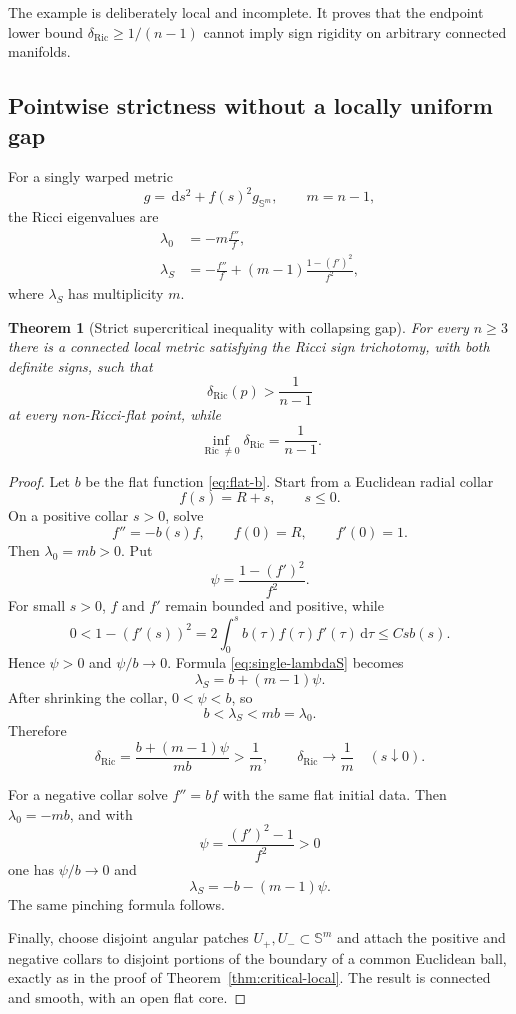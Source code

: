 \documentclass[11pt,reqno]{amsart}
\newtheorem{theorem}{Theorem}[section]
\theoremstyle{definition}
\theoremstyle{remark}
\newcommand{\Ric}{\operatorname{Ric}}
\newcommand{\dd}{\,\mathrm d}
\newcommand{\Sph}{\mathbb S}
\newcommand{\dric}{\delta_{\mathrm{Ric}}}
\begin{document}
The example is deliberately local and incomplete.  It proves that the endpoint lower bound $\dric\ge1/(n-1)$ cannot imply sign rigidity on arbitrary connected manifolds.

\subsection{Pointwise strictness without a locally uniform gap}

For a singly warped metric
\begin{equation}\label{eq:singly-sphere}
g=\dd s^2+f(s)^2g_{\Sph^m},
\qquad m=n-1,
\end{equation}
the Ricci eigenvalues are
\begin{align}
\lambda_0&=-m\frac{f''}{f},\label{eq:single-lambda0}\\
\lambda_S&=-\frac{f''}{f}+(m-1)\frac{1-(f')^2}{f^2},\label{eq:single-lambdaS}
\end{align}
where $\lambda_S$ has multiplicity $m$.

\begin{theorem}[Strict supercritical inequality with collapsing gap]\label{thm:strict-no-gap}
For every $n\ge3$ there is a connected local metric satisfying the Ricci sign trichotomy, with both definite signs, such that
\[
\dric(p)>\frac1{n-1}
\]
at every non-Ricci-flat point, while
\[
\inf_{\Ric\ne0}\dric=\frac1{n-1}.
\]
\end{theorem}

\begin{proof}
Let $b$ be the flat function \eqref{eq:flat-b}.  Start from a Euclidean radial collar
\[
f(s)=R+s,
\qquad s\le0.
\]
On a positive collar $s>0$, solve
\[
f''=-b(s)f,
\qquad f(0)=R,
\qquad f'(0)=1.
\]
Then $\lambda_0=mb>0$.  Put
\[
\psi=\frac{1-(f')^2}{f^2}.
\]
For small $s>0$, $f$ and $f'$ remain bounded and positive, while
\[
0<1-(f'(s))^2
=2\int_0^sb(\tau)f(\tau)f'(\tau)\dd\tau
\le Csb(s).
\]
Hence $\psi>0$ and $\psi/b\to0$.  Formula \eqref{eq:single-lambdaS} becomes
\[
\lambda_S=b+(m-1)\psi.
\]
After shrinking the collar, $0<\psi<b$, so
\[
b<\lambda_S<mb=\lambda_0.
\]
Therefore
\[
\dric=\frac{b+(m-1)\psi}{mb}>\frac1m,
\qquad
\dric\longrightarrow\frac1m
\quad(s\downarrow0).
\]

For a negative collar solve $f''=bf$ with the same flat initial data.  Then $\lambda_0=-mb$, and with
\[
\psi=\frac{(f')^2-1}{f^2}>0
\]
one has $\psi/b\to0$ and
\[
\lambda_S=-b-(m-1)\psi.
\]
The same pinching formula follows.

Finally, choose disjoint angular patches $U_+,U_-\subset\Sph^m$ and attach the positive and negative collars to disjoint portions of the boundary of a common Euclidean ball, exactly as in the proof of Theorem~\ref{thm:critical-local}.  The result is connected and smooth, with an open flat core.
\end{proof}
\end{document}
